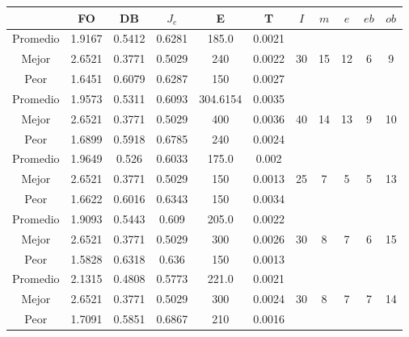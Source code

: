 \begin{table}[h!]
    \footnotesize
    \begin{center}
        \begin{tabular}{|c|c|c|c|c|c|c|c|c|c|c|}
        \hline
            & {\bf FO} & {\bf DB} & $J_e$ & {\bf E} & {\bf T} & $I$ & $m$ & $e$ & $eb$ & $ob$ \\
        \hline
        \hline
            Promedio  & 1.9167 & 0.5412 & 0.6281 & 185.0 & 0.0021 &  &  &  &  & \\
            \cline{1-6}
            Mejor & 2.6521 & 0.3771  & 0.5029 & 240 & 0.0022 & 30 & 15 & 12 & 6 & 9\\
            \cline{1-6}
            Peor & 1.6451 & 0.6079  & 0.6287 & 150 & 0.0027 &  &  &  &  & \\
        \hline
        \hline
            Promedio  & 1.9573 & 0.5311 & 0.6093 & 304.6154 & 0.0035 &  &  &  &  & \\
            \cline{1-6}
            Mejor & 2.6521 & 0.3771  & 0.5029 & 400 & 0.0036 & 40 & 14 & 13 & 9 & 10\\
            \cline{1-6}
            Peor & 1.6899 & 0.5918  & 0.6785 & 240 & 0.0024 &  &  &  &  & \\
        \hline
        \hline
            Promedio  & 1.9649 & 0.526 & 0.6033 & 175.0 & 0.002 &  &  &  &  & \\
            \cline{1-6}
            Mejor & 2.6521 & 0.3771  & 0.5029 & 150 & 0.0013 & 25 & 7 & 5 & 5 & 13\\
            \cline{1-6}
            Peor & 1.6622 & 0.6016  & 0.6343 & 150 & 0.0034 &  &  &  &  & \\
        \hline
        \hline
            Promedio  & 1.9093 & 0.5443 & 0.609 & 205.0 & 0.0022 &  &  &  &  & \\
            \cline{1-6}
            Mejor & 2.6521 & 0.3771  & 0.5029 & 300 & 0.0026 & 30 & 8 & 7 & 6 & 15\\
            \cline{1-6}
            Peor & 1.5828 & 0.6318  & 0.636 & 150 & 0.0013 &  &  &  &  & \\
        \hline
        \hline
            Promedio  & 2.1315 & 0.4808 & 0.5773 & 221.0 & 0.0021 &  &  &  &  & \\
            \cline{1-6}
            Mejor & 2.6521 & 0.3771  & 0.5029 & 300 & 0.0024 & 30 & 8 & 7 & 7 & 14\\
            \cline{1-6}
            Peor & 1.7091 & 0.5851  & 0.6867 & 210 & 0.0016 &  &  &  &  & \\
        \hline

\end{tabular}
\end{center}
\end{table}
